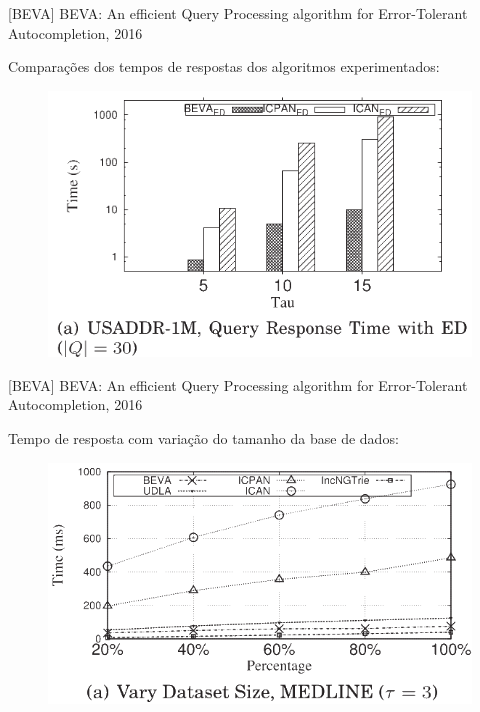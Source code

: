 \documentclass[11pt]{beamer}
\begin{document}
\begin{frame}{[BEVA] BEVA: An efficient Query Processing algorithm for Error-Tolerant Autocompletion, 2016}

    Comparações dos tempos de respostas dos algoritmos experimentados:
    
    \begin{figure}
      \includegraphics[scale=0.40]{pictures/time_response_with_ed_beva.png}
      \centering
    \end{figure}
   
\end{frame}

\begin{frame}{[BEVA] BEVA: An efficient Query Processing algorithm for Error-Tolerant Autocompletion, 2016}

    Tempo de resposta com variação do tamanho da base de dados:
    
    \begin{figure}
      \includegraphics[scale=0.40]{pictures/varyng_dataset_size_beva.png}
      \centering
    \end{figure}
   
\end{frame}
\end{document}
